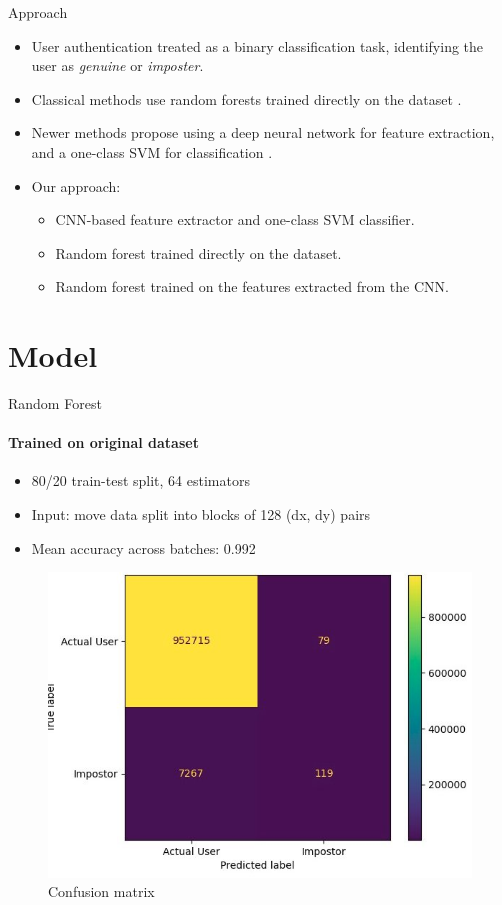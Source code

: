 \documentclass{beamer}
\begin{document}
\begin{frame}{Approach}
\begin{itemize}
    \item User authentication treated as a binary classification task, identifying the user as \textit{genuine} or \textit{imposter}.
    \item Classical methods use random forests trained directly on the dataset \cite{thomasBroadReviewNonintrusive2021}.
    \item Newer methods propose using a deep neural network for feature extraction, and a one-class SVM for classification \cite{antalSapiMouseMouseDynamicsbased2021}.
    \item Our approach:
    \begin{itemize}
        \item CNN-based feature extractor and one-class SVM classifier.
        \item Random forest trained directly on the dataset.
        \item Random forest trained on the features extracted from the CNN.
    \end{itemize}
\end{itemize}
\end{frame}

\section{Model}

\begin{frame}{Random Forest}
\framesubtitle{Trained on original dataset}
\begin{itemize}
    \item 80/20 train-test split, 64 estimators
    \item Input: move data split into blocks of 128 (dx, dy) pairs
    \item Mean accuracy across batches: 0.992
\end{itemize}

\begin{figure}
    \centering
    \includegraphics[width = .5\textwidth]{theme/images/confusion_matrix_rfm.png}
    \caption{Confusion matrix}
    \label{fig:confusion_matrix_rfm}
\end{figure}

\end{frame}
\end{document}
